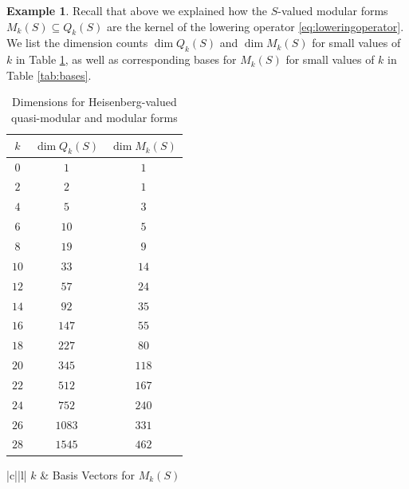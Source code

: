 \documentclass[12pt]{amsart}
\theoremstyle{plain}
\theoremstyle{definition}
\newtheorem{ex}[thm]{Example}
\theoremstyle{remark}
\begin{document}
\begin{ex}
Recall that above we explained how the $S$-valued modular forms $M_k(S)\subseteq Q_k(S)$ are the kernel of the lowering operator \eqref{eq:loweringoperator}. 
We list the dimension counts $\dim Q_k(S)$ and $\dim M_k(S)$ for small values of $k$ in Table \ref{tab:dimensions}, as well as corresponding bases for $M_k(S)$ for small values of $k$ in Table \ref{tab:bases}.
    \begin{table}
    \centering
        \begin{tabular}{|c|c|c|}
             \hline
             $k$ & $\dim Q_k(S)$ & $\dim M_k(S)$ \\
             \hline
             $0$ & $1$ & $1$  \\
             \hline
             $2$ & $2$ & $1$  \\
             \hline
             $4$ & $5$ & $3$ \\
             \hline
             $6$ & $10$ & $5$ \\
            \hline
             $8$ & $19$ & $9$ \\
             \hline
             $10$ & $33$ & $14$ \\
             \hline
             $12$ & $57$ & $24$ \\
             \hline
             $14$ & $92$ & $35$ \\
             \hline
             $16$ & $147$ & $55$ \\
             \hline
             $18$ & $227$ & $80$ \\
             \hline
             $20$ & $345$ & $118$ \\
             \hline
             $22$ & $512$ & $167$ \\
             \hline
             $24$ & $752$ & $240$ \\
             \hline
             $26$ & $1083$ & $331$ \\
             \hline
             $28$ & $1545$ & $462$ \\
             \hline
        \end{tabular}
        \caption{Dimensions for Heisenberg-valued quasi-modular and modular forms}
        \label{tab:dimensions}
    \end{table}
    \begin{table}    
    \centering
        \begin{tblr}{|c||l|}
            \hline
             $k$ & Basis Vectors for $M_{k}(S)$ \\
             \hline \hline

\end{tblr}
\end{table}
\end{ex}
\end{document}
